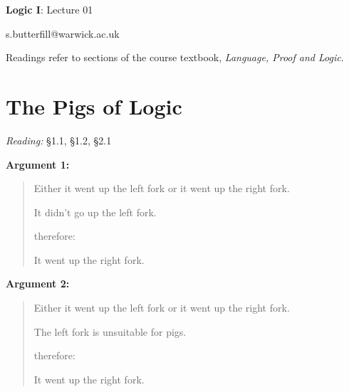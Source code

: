 \documentclass[12pt]{extarticle}
\date{}
\makeatletter
\def \ititle {Origins of Mind}
\def \isubtitle {Lecture 08}
\def \iemail{s.butterfill@warwick.ac.uk}
\makeatother
\begin{document}

\begin{multicols*}{3}

\setlength\footnotesep{1em}









\def \ititle {Logic I}
 
\def \isubtitle {Lecture 01}
 
\begin{center}
 
{\Large
 
\textbf{\ititle}: \isubtitle
 
}
 
 
 
\iemail %
 
\end{center}
 
Readings refer to sections of the course textbook, \emph{Language, Proof and Logic}.
 
 
 
\section{The Pigs of Logic}
 
\emph{Reading:} §1.1, §1.2, §2.1
 
\textbf{Argument 1:} \begin{quote} Either it went up the left fork or it went up the right fork.

It didn’t go up the left fork.

therefore:

It went up the right fork. \end{quote}

\textbf{Argument 2:} \begin{quote} Either it went up the left fork or it went up the right fork.

The left fork is unsuitable for pigs.

therefore:

It went up the right fork. \end{quote}

 
\begin{minipage}{\columnwidth}
 

\end{minipage}
\end{multicols*}
\end{document}
